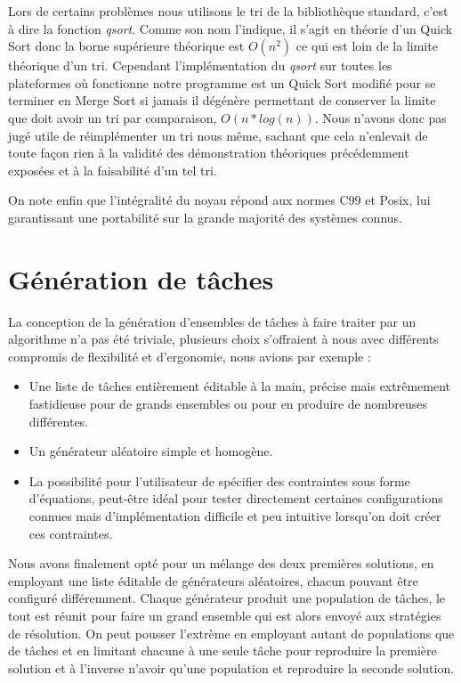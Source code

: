 Lors de certains problèmes nous utilisons le tri de la bibliothèque standard,
c'est à dire la fonction {\em qsort}. Comme son nom l'indique, il s'agit en
théorie d'un Quick Sort donc la borne supérieure théorique est $O(n^2)$ ce qui
est loin de la limite théorique d'un tri. Cependant l'implémentation du {\em
qsort} sur toutes les plateformes où fonctionne notre programme est un Quick
Sort modifié pour se terminer en Merge Sort si jamais il dégénère permettant de
conserver la limite que doit avoir un tri par comparaison, $O(n*log(n))$. Nous
n'avons donc pas jugé utile de réimplémenter un tri nous même, sachant que cela
n'enlevait de toute façon rien à la validité des démonstration théoriques
précédemment exposées et à la faisabilité d'un tel tri.

On note enfin que l'intégralité du noyau répond aux normes C99 et Posix, lui
garantissant une portabilité sur la grande majorité des systèmes connus.
\section{Génération de tâches}
La conception de la génération d'ensembles de tâches à faire traiter par un
algorithme n'a pas été triviale, plusieurs choix s'offraient à nous avec différents
compromis de flexibilité et d'ergonomie, nous avions par exemple :
\begin{itemize}
   \item Une liste de tâches entièrement éditable à la main, précise mais extrêmement
   fastidieuse pour de grands ensembles ou pour en produire de nombreuses différentes.
   \item Un générateur aléatoire simple et homogène.
   \item La possibilité pour l'utilisateur de spécifier des contraintes sous forme
   d'équations, peut-être idéal pour tester directement certaines configurations
   connues mais d'implémentation difficile et peu intuitive lorsqu'on doit créer
   ces contraintes.
\end{itemize}
Nous avons finalement opté pour un mélange des deux premières solutions, en
employant une liste éditable de générateurs aléatoires, chacun pouvant être
configuré différemment. Chaque générateur produit une population de tâches,
le tout est réunit pour faire un grand ensemble qui est alors envoyé aux
stratégies de résolution. On peut pousser l'extrème en employant autant de
populations que de tâches et en limitant chacune à une seule tâche pour reproduire
la première solution et à l'inverse n'avoir qu'une population et reproduire la seconde
solution.
